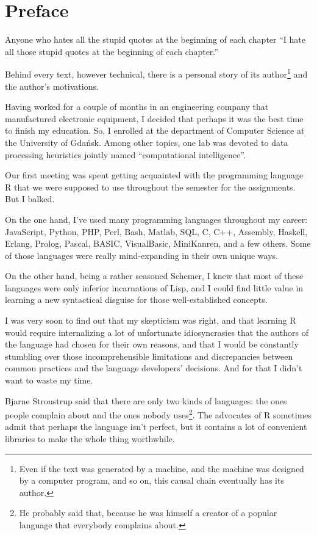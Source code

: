 \chapter*{Preface}

\begin{chapquote}{Anyone who hates all the stupid quotes
at the beginning of each chapter}
``I hate all those stupid quotes at the beginning of each chapter.''
\end{chapquote}


Behind every text, however technical, there is a personal story of
its author\footnote{Even if the text was generated by a machine, and
the machine was designed by a computer program, and so on, this causal
chain eventually has its author.} and the author's motivations.

Having worked for a couple of months in an engineering company that
manufactured electronic equipment, I decided that perhaps it was the
best time to finish my education. So, I enrolled at the department of
Computer Science at the University of Gdańsk. Among other topics,
one lab was devoted to data processing heuristics jointly named 
``computational intelligence''.

Our first meeting was spent getting acquainted with the
programming language R that we were supposed to use throughout
the semester for the assignments. But I balked.

On the one hand, I've used many programming languages throughout my career:
JavaScript, Python, PHP, Perl, Bash, Matlab, SQL, C, C++, Assembly, Haskell,
Erlang, Prolog, Pascal, BASIC, VisualBasic, MiniKanren, and a few others. 
Some of those languages were really mind-expanding in their own unique ways.

On the other hand, being a rather seasoned Schemer, I knew that
most of these languages were only inferior incarnations of Lisp,
and I could find little value in learning a new syntactical disguise
for those well-established concepts.

I was very soon to find out that my skepticism was right, and that
learning R would require internalizing a lot of unfortunate
idiosyncrasies that the authors of the language had chosen for their
own reasons, and that I would be constantly stumbling over
those incomprehensible limitations and discrepancies between common
practices and the language developers' decisions. And for that
I didn't want to waste my time.

Bjarne Stroustrup said that there are only two kinds of languages:
the ones people complain about and the ones nobody uses\footnote{He
probably said that, because he was himself a creator of a popular
language that everybody complains about.}. The advocates of R sometimes
admit that perhaps the language isn't perfect, but it contains
a lot of convenient libraries to make the whole thing worthwhile.

